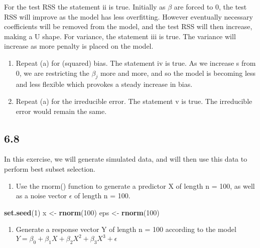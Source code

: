 \documentclass[]{article}
\newenvironment{Shaded}{\begin{snugshade}}{\end{snugshade}}
\newcommand{\KeywordTok}[1]{\textcolor[rgb]{0.13,0.29,0.53}{\textbf{{#1}}}}
\newcommand{\DecValTok}[1]{\textcolor[rgb]{0.00,0.00,0.81}{{#1}}}
\newcommand{\StringTok}[1]{\textcolor[rgb]{0.31,0.60,0.02}{{#1}}}
\newcommand{\NormalTok}[1]{{#1}}
\providecommand{\tightlist}{%
  \setlength{\itemsep}{0pt}\setlength{\parskip}{0pt}}
\begin{document}
For the test RSS the statement ii is true. Initially as \(\beta\) are
forced to 0, the test RSS will improve as the model has less
overfitting. However eventually necessary coefficients will be removed
from the model, and the test RSS will then increase, making a U shape.
For variance, the statement iii is true. The variance will increase as
more penalty is placed on the model.

\begin{enumerate}
\def\labelenumi{(\alph{enumi})}
\setcounter{enumi}{3}
\item
  Repeat (a) for (squared) bias. The statement iv is true. As we
  increase s from 0, we are restricting the \(\beta_j\) more and more,
  and so the model is becoming less and less flexible which provokes a
  steady increase in bias.
\item
  Repeat (a) for the irreducible error. The statement v is true. The
  irreducible error would remain the same.
\end{enumerate}

\subsection{6.8}\label{section-3}

In this exercise, we will generate simulated data, and will then use
this data to perform best subset selection.

\begin{enumerate}
\def\labelenumi{(\alph{enumi})}
\tightlist
\item
  Use the rnorm() function to generate a predictor X of length n = 100,
  as well as a noise vector \(\epsilon\) of length n = 100.
\end{enumerate}

\begin{Shaded}
\begin{Highlighting}[]
\KeywordTok{set.seed}\NormalTok{(}\DecValTok{1}\NormalTok{)}
\NormalTok{x <-}\StringTok{ }\KeywordTok{rnorm}\NormalTok{(}\DecValTok{100}\NormalTok{)}
\NormalTok{eps <-}\StringTok{ }\KeywordTok{rnorm}\NormalTok{(}\DecValTok{100}\NormalTok{)}
\end{Highlighting}
\end{Shaded}

\begin{enumerate}
\def\labelenumi{(\alph{enumi})}
\setcounter{enumi}{1}
\tightlist
\item
  Generate a response vector Y of length n = 100 according to the model
  \(Y=\beta_0 +\beta_1X+\beta_2X^2+\beta_3X^3+\epsilon\)
\end{enumerate}
\end{document}
